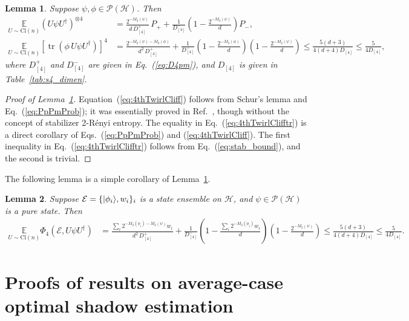 \documentclass[aps,pra,twocolumn,nofootinbib,superscriptaddress,10pt]{revtex4-2}
\newtheorem{lemma}{Lemma}
\DeclarePairedDelimiter{\ket}{\lvert}{\rangle}
\DeclareMathOperator{\tr}{tr}
\newcommand{\Cl}{\mathrm{Cl}}
\newcommand{\bbE}{\mathbb{E}}
\newcommand{\caE}{\mathcal{E}}
\newcommand{\caH}{\mathcal{H}}
\newcommand{\caP}{\mathcal{P}}
\newcommand{\eref}[1]{Eq.~\textup{(\ref{#1})}}
\newcommand{\Eref}[1]{Equation~\textup{(\ref{#1})}}
\newcommand{\eqsref}[2]{Eqs.~(\ref{#1}) and (\ref{#2})}
\newcommand{\lref}[1]{Lemma~\ref{#1}}
\newcommand{\tref}[1]{Table~\ref{#1}}
\newcommand{\rcite}[1]{Ref.~\cite{#1}}
\begin{document}
\begin{lemma}
\label{lem:4th_tr_Cliff}
Suppose $\psi, \phi \in \caP(\caH)$. Then
    \begin{align}
\underset{U\sim \Cl(n)}{\bbE}\left(U \psi U^{\dagger}\right)^{\otimes 4}
    &=\frac{2^{-M_{2}(\psi)}}{d\,D^{+}_{[4]}}\,P_++\frac{1}{D^{-}_{[4]}}\left(1-\frac{2^{-M_{2}(\psi)}}{d}\right)P_-,  \label{eq:4thTwirlCliff}\\
\underset{U\sim \Cl(n)}{\bbE}\left[\tr\left(\phi\, U \psi U^{\dagger}\right)\right]^4
    &=\frac{2^{-M_{2}(\psi)-M_{2}(\phi)}}{d^2\,D^{+}_{[4]}}+\frac{1}{D^{-}_{[4]}}\left(1-\frac{2^{-M_{2}(\phi)}}{d}\right)\left(1-\frac{2^{-M_{2}(\psi)}}{d}\right)\leq \frac{5(d+3)}{4(d+4)D_{[4]}}\leq \frac{5}{4D_{[4]}}, \label{eq:4thTwirlClifftr}
    \end{align}
where $D^{+}_{[4]}$ and $D^{-}_{[4]}$ are given in \eref{eq:D4pm}, and $D_{[4]}$ is given in \tref{tab:s4_dimen}.
\end{lemma}
\begin{proof}[Proof of \lref{lem:4th_tr_Cliff}]
\Eref{eq:4thTwirlCliff} follows from Schur's lemma and \eref{eq:PpPmProb}; it was essentially proved in \rcite{Zhu16}, though without the concept of stabilizer 2-R\'enyi entropy. The equality in \eref{eq:4thTwirlClifftr} is a direct corollary of \eqsref{eq:PpPmProb}{eq:4thTwirlCliff}. The first inequality in \eref{eq:4thTwirlClifftr} follows from \eref{eq:stab_bound}, and the second is trivial.
\end{proof}

The following lemma is a simple corollary of \lref{lem:4th_tr_Cliff}.
\begin{lemma}
\label{lem:4th_poten_Cliff}
Suppose $\caE=\{\ket{\phi_{i}}, w_i\}_i$ is a state ensemble on $\caH$, and $\psi \in \caP(\caH)$ is a pure state. Then
     \begin{align}
         \underset{U\sim \Cl(n)}{\bbE}\Phi_4\left(\caE,U\psi U^{\dagger}\right)&
    =\frac{\sum_i 2^{-M_{2}(\phi_i)-M_{2}(\psi)}w_i}{d^2\,D^{+}_{[4]}}+\frac{1}{D^{-}_{[4]}}\left(1-\frac{\sum_i 2^{-M_{2}(\phi_i)}w_i}{d}\right)\left(1-\frac{2^{-M_{2}(\psi)}}{d}\right)\leq \frac{5(d+3)}{4(d+4)D_{[4]}}\leq \frac{5}{4D_{[4]}}.
    \end{align}
\end{lemma}


\section{Proofs of results on average-case optimal shadow estimation}
\label{sup:avg_norm_up}
\end{document}
